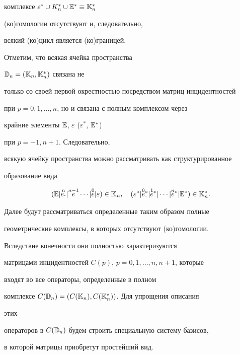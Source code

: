 комплексе $\varepsilon^*\cup K^*_n\cup\Bbb E^*\equiv\Bbb K^*_n$  


(ко)гомологии отсутствуют и, следовательно, 


всякий (ко)цикл является (ко)границей. 


 


Отметим, что всякая ячейка пространства 


$\Bbb D_n=(\Bbb K_n,\Bbb K^*_n)$ связана не 


только со своей первой окрестностью посредством матриц инцидентностей 


при $p=0,1,\dotsc,n$, но и связана с полным комплексом через 


крайние элементы $\Bbb E$, $\varepsilon$ ($\varepsilon^*$, $\Bbb E^*$) 


при $p=-1,n+1$. Следовательно, 


всякую ячейку пространства можно рассматривать как структурированное 


образование вида 


\begin{equation} 


(\Bbb E|\up{n}{e\scd}|\up{n-1}{e}\dotsb|\up{0}{e}|\varepsilon)\in\Bbb K_n, 


\quad 


(\varepsilon^*|\up{0}{e}\scd^*|\up{1}{e}^*|\dotsb|\up{n}{e}^*| 


\Bbb E^*)\in\Bbb K^*_n. 


\end{equation} 


 


Далее будут рассматриваться определенные таким образом полные 


геометрические комплексы, в которых отсутствуют (ко)гомологии. 


Вследствие конечности они полностью характеризуются 


матрицами инцидентностей $C(p)$, $p=0,1,\dotsc,n,n+1$, которые 


входят во все операторы, определенные в полном 


комплексе $C(\Bbb D_n)=(C(\Bbb K_n),C(\Bbb K^*_n))$. Для упрощения описания 


этих 


операторов в $C(\Bbb D_n)$ будем строить специальную систему базисов, 


в которой матрицы приобретут простейший вид. 


